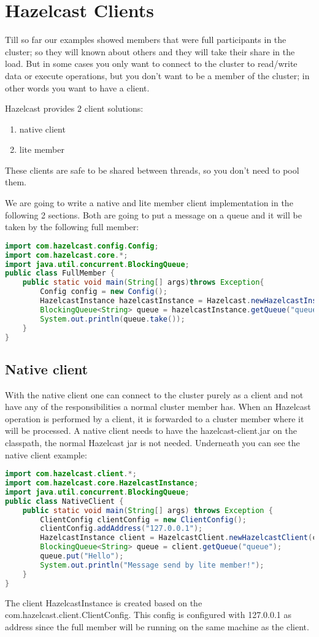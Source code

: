 \chapter{Hazelcast Clients}

Till so far our examples showed members that were full participants in the cluster; so they will known about others and they will take their share in the load. But in some cases you only want to connect to the cluster to read/write data or execute operations, but you don't want to be a member of the cluster; in other words you want to have a client.

Hazelcast provides 2 client solutions:
\begin{enumerate}
\item native client
\item lite member
\end{enumerate}
These clients are safe to be shared between threads, so you don't need to pool them.

We are going to write a native and lite member client implementation in the following 2 sections. Both are going to put a message on a queue and it will be taken by the following full member:
\begin{lstlisting}[language=java]
import com.hazelcast.config.Config;
import com.hazelcast.core.*;
import java.util.concurrent.BlockingQueue;
public class FullMember {
    public static void main(String[] args)throws Exception{
        Config config = new Config();
        HazelcastInstance hazelcastInstance = Hazelcast.newHazelcastInstance(config);
        BlockingQueue<String> queue = hazelcastInstance.getQueue("queue");
        System.out.println(queue.take());       
    }
}
\end{lstlisting}
\section{Native client}
With the native client one can connect to the cluster purely as a client and not have any of the responsibilities a normal cluster member has. When an Hazelcast operation is performed by a client, it is forwarded to a cluster member where it will be processed. A native client needs to have the hazelcast-client.jar on the classpath, the normal Hazelcast jar is not needed. Underneath you can see the native client example:
\begin{lstlisting}[language=java]
import com.hazelcast.client.*;
import com.hazelcast.core.HazelcastInstance;
import java.util.concurrent.BlockingQueue;
public class NativeClient {
    public static void main(String[] args) throws Exception {
        ClientConfig clientConfig = new ClientConfig();
        clientConfig.addAddress("127.0.0.1");
        HazelcastInstance client = HazelcastClient.newHazelcastClient(clientConfig);
        BlockingQueue<String> queue = client.getQueue("queue");
        queue.put("Hello");
        System.out.println("Message send by lite member!");
    }
}
\end{lstlisting}
The client HazelcastInstance is created based on the com.hazelcast.client.ClientConfig. This config is configured with 127.0.0.1 as address since the full member will be running on the same machine as the client.

